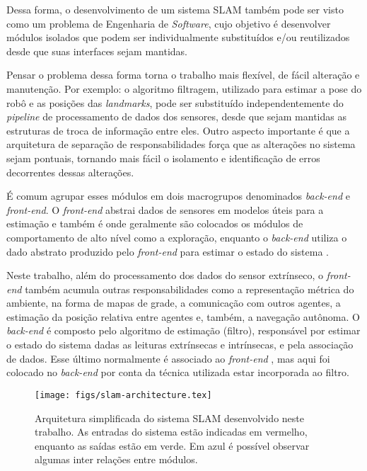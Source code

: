 Dessa forma, o desenvolvimento de 
um sistema SLAM também pode ser visto como um problema de Engenharia de
\textit{Software}, cujo objetivo é desenvolver módulos isolados que podem 
ser individualmente substituídos e/ou reutilizados desde que suas interfaces 
sejam mantidas.

Pensar o problema dessa forma torna o trabalho mais flexível, de fácil alteração e manutenção. 
Por exemplo: o algoritmo filtragem, utilizado para estimar a pose do robô e as 
posições das \textit{landmarks}, pode ser substituído independentemente do 
\textit{pipeline} de processamento de dados dos sensores, desde que sejam 
mantidas as estruturas de troca de informação entre eles. 
Outro aspecto importante é que a arquitetura de separação de 
responsabilidades força que as alterações no sistema sejam pontuais, 
tornando mais fácil o isolamento e identificação de erros decorrentes 
dessas alterações.

É comum agrupar esses módulos em dois macrogrupos denominados 
\textit{back-end} e \textit{front-end}. O \textit{front-end} abstrai dados de 
sensores em modelos úteis para a estimação e também é onde geralmente são colocados os módulos de comportamento de alto nível como a exploração, enquanto o \textit{back-end} utiliza 
o dado abstrato produzido pelo \textit{front-end} para estimar o estado do 
sistema \cite{cadena2016past}.

Neste trabalho, além do processamento dos dados do sensor extrínseco, o 
\textit{front-end} também acumula outras responsabilidades como a representação 
métrica do ambiente, na forma de mapas de grade, a comunicação com outros 
agentes, a estimação da posição relativa entre agentes e, também, a navegação 
autônoma. O \textit{back-end} é composto pelo algoritmo de estimação (filtro), 
responsável por estimar o estado do sistema dadas as leituras extrínsecas e intrínsecas, e pela associação de dados. Esse último normalmente é 
associado ao \textit{front-end} \cite[]{cadena2016past}, mas aqui foi 
colocado no \textit{back-end} por conta da técnica utilizada estar 
incorporada ao filtro.

\begin{figure}[h]
  \centering
  \texttt{[image: figs/slam-architecture.tex]}
  \caption[Arquitetura simplificada do sistema SLAM desenvolvido]{Arquitetura simplificada do sistema SLAM desenvolvido neste trabalho. As entradas do sistema estão indicadas em vermelho, enquanto as saídas estão em verde. Em azul é 
  possível observar algumas inter relações entre módulos.}
  \label{fig:slam-architecture}
\end{figure}


